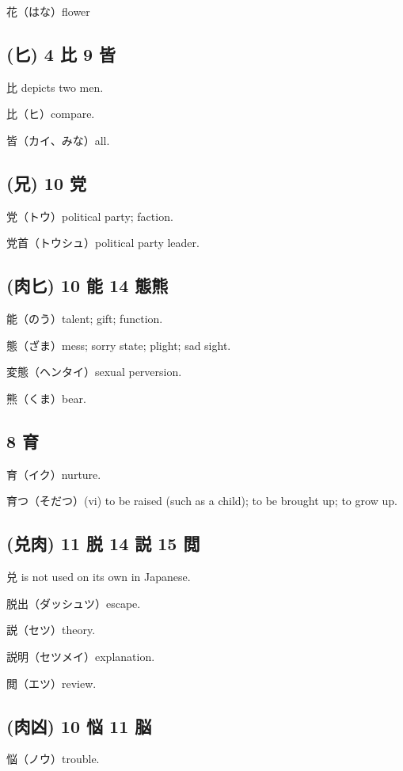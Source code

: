 花（はな）flower

\subsection{(匕) 4 比 9 皆}

比 depicts two men.

比（ヒ）compare.

皆（カイ、みな）all.

\subsection{(兄) 10 党}

党（トウ）political party; faction.

党首（トウシュ）political party leader.

\subsection{(肉匕) 10 能 14 態熊}

能（のう）talent; gift; function.

態（ざま）mess; sorry state; plight; sad sight.

変態（ヘンタイ）sexual perversion.

熊（くま）bear.

\subsection{8 育}

育（イク）nurture.

育つ（そだつ）(vi) to be raised (such as a child); to be brought up; to grow up.

\subsection{(兑肉) 11 脱 14 説 15 閲}

兑 is not used on its own in Japanese.

脱出（ダッシュツ）escape.

説（セツ）theory.

説明（セツメイ）explanation.

閲（エツ）review.

\subsection{(肉凶) 10 悩 11 脳}

悩（ノウ）trouble.

